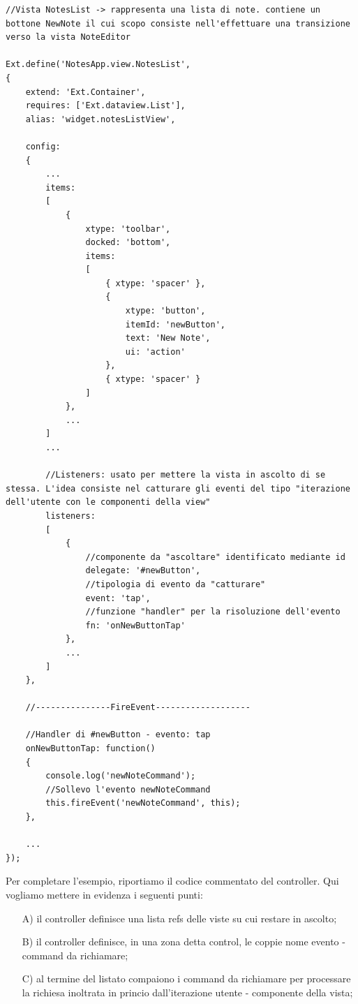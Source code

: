 \documentclass[10pt,a4paper,onecolumn]{article}
\begin{document}
\begin{lstlisting}
//Vista NotesList -> rappresenta una lista di note. contiene un bottone NewNote il cui scopo consiste nell'effettuare una transizione verso la vista NoteEditor

Ext.define('NotesApp.view.NotesList',
{
	extend: 'Ext.Container',
	requires: ['Ext.dataview.List'],
	alias: 'widget.notesListView',
	
	config:
	{
		...
		items:
		[
			{
				xtype: 'toolbar',
				docked: 'bottom',
				items:
				[
					{ xtype: 'spacer' },
					{ 
						xtype: 'button',
						itemId: 'newButton',
						text: 'New Note',
						ui: 'action'
					},
					{ xtype: 'spacer' }
				]
			},	
			...
		]
		...
		
		//Listeners: usato per mettere la vista in ascolto di se stessa. L'idea consiste nel catturare gli eventi del tipo "iterazione dell'utente con le componenti della view"
		listeners:
		[
			{
				//componente da "ascoltare" identificato mediante id
				delegate: '#newButton',
				//tipologia di evento da "catturare"
				event: 'tap',
				//funzione "handler" per la risoluzione dell'evento
				fn: 'onNewButtonTap'
			},
			...
		]
	},
	
	//---------------FireEvent-------------------
	
	//Handler di #newButton - evento: tap
	onNewButtonTap: function()
	{
		console.log('newNoteCommand');
		//Sollevo l'evento newNoteCommand
		this.fireEvent('newNoteCommand', this);
	},
	
	...
});
\end{lstlisting}

Per completare l'esempio, riportiamo il codice commentato del controller. Qui vogliamo mettere in evidenza i seguenti punti:

\begin{itemize}
	\item[A)] il controller definisce una lista refs delle viste su cui restare in ascolto;
	\item[B)] il controller definisce, in una zona detta control, le coppie nome evento - command da richiamare;
	\item[C)] al termine del listato compaiono i command da richiamare per processare la richiesa inoltrata in princio dall'iterazione utente - componente della vista;
\end{itemize}
\end{document}
